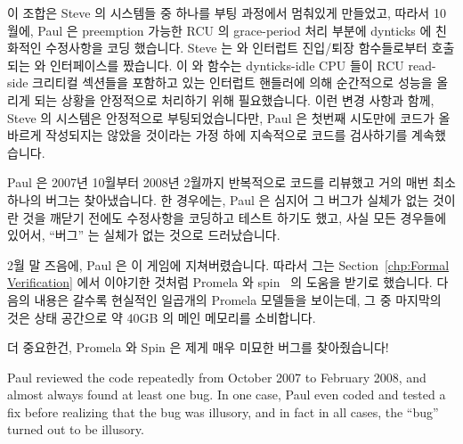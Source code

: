 이 조합은 Steve 의 시스템들 중 하나를 부팅 과정에서 멈춰있게 만들었고, 따라서
10월에, Paul 은 preemption 가능한 RCU 의 grace-period 처리 부분에 dynticks 에
친화적인 수정사항을 코딩 했습니다.
Steve 는  와  인터럽트 진입/퇴장 함수들로부터
호출되는  와  인터페이스를 짰습니다.
이  와  함수는 dynticks-idle CPU 들이
RCU read-side 크리티컬 섹션들을 포함하고 있는 인터럽트 핸들러에 의해 순간적으로
성능을 올리게 되는 상황을 안정적으로 처리하기 위해 필요했습니다.
이런 변경 사항과 함께, Steve 의 시스템은 안정적으로 부팅되었습니다만, Paul 은
첫번째 시도만에 코드가 올바르게 작성되지는 않았을 것이라는 가정 하에 지속적으로
코드를 검사하기를 계속했습니다.
\iffalse

This combination caused one of Steve's systems to hang on boot, so in
October, Paul coded up a dynticks-friendly modification to preemptible RCU's
grace-period processing.
Steve coded up \co{rcu_irq_enter()} and \co{rcu_irq_exit()}
interfaces called from the
\co{irq_enter()} and \co{irq_exit()} interrupt
entry/exit functions.
These \co{rcu_irq_enter()} and \co{rcu_irq_exit()}
functions are needed to allow RCU to reliably handle situations where
a dynticks-idle CPUs is momentarily powered up for an interrupt
handler containing RCU read-side critical sections.
With these changes in place, Steve's system booted reliably,
but Paul continued inspecting the code periodically on the assumption
that we could not possibly have gotten the code right on the first try.
\fi

Paul 은 2007년 10월부터 2008년 2월까지 반복적으로 코드를 리뷰했고 거의 매번
최소 하나의 버그는 찾아냈습니다.
한 경우에는, Paul 은 심지어 그 버그가 실체가 없는 것이란 것을 깨닫기 전에도
수정사항을 코딩하고 테스트 하기도 했고, 사실 모든 경우들에 있어서, ``버그'' 는
실체가 없는 것으로 드러났습니다.

2월 말 즈음에, Paul 은 이 게임에 지쳐버렸습니다.
따라서 그는
Section~\ref{chp:Formal Verification} 에서 이야기한 것처럼 Promela 와
spin~\cite{Holzmann03a} 의 도움을 받기로 했습니다.
다음의 내용은 갈수록 현실적인 일곱개의 Promela 모델들을 보이는데, 그 중
마지막의 것은 상태 공간으로 약 40GB 의 메인 메모리를 소비합니다.

더 중요한건, Promela 와 Spin 은 제게 매우 미묘한 버그를 찾아줬습니다!
\iffalse

Paul reviewed the code repeatedly from October 2007 to February 2008,
and almost always found at least one bug.
In one case, Paul even coded and tested a fix before realizing that the
bug was illusory, and in fact in all cases, the ``bug'' turned out to be
illusory.

